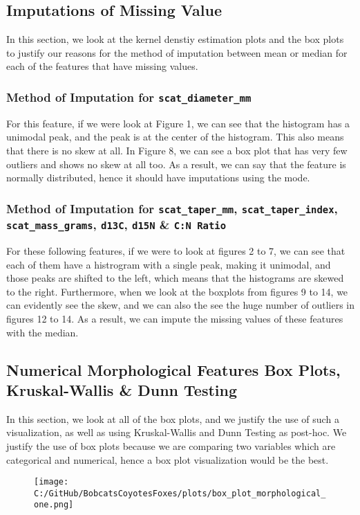 \documentclass[a4paper]{article}
\begin{document}
\subsection{Imputations of Missing Value}
In this section, we look at the kernel denstiy estimation plots and the box plots to justify our reasons for the method of imputation between mean or median 
for each of the features that have missing values.

\subsubsection{Method of Imputation for \texttt{scat\_diameter\_mm}}
For this feature, if we were look at Figure 1, we can see that the histogram has a unimodal peak, and the peak is at the center of the histogram. This also
means that there is no skew at all. In Figure 8, we can see a box plot that has very few outliers and shows no skew at all too. As a result, we can say that
the feature is normally distributed, hence it should have imputations using the mode.

\subsubsection{Method of Imputation for \texttt{scat\_taper\_mm}, \texttt{scat\_taper\_index}, \texttt{scat\_mass\_grams}, \texttt{d13C}, \texttt{d15N} \& 
\texttt{C:N Ratio}}
For these following features, if we were to look at figures 2 to 7, we can see that each of them have a histrogram with a single peak, making it unimodal,
and those peaks are shifted to the left, which means that the histograms are skewed to the right.  Furthermore, when we look at the boxplots from figures
9 to 14, we can evidently see the skew, and we can also the see the huge number of outliers in figures 12 to 14. As a result, we can impute the missing values
of these features with the median.

\newpage

\subsection{Numerical Morphological Features Box Plots, Kruskal-Wallis \& Dunn Testing}
In this section, we look at all of the box plots, and we justify the use of such a visualization, as well as using Kruskal-Wallis and Dunn Testing as post-hoc.
We justify the use of box plots because we are comparing two variables which are categorical and numerical, hence a box plot  visualization would be the best.
\vspace{0.5cm}
\begin{figure}[h]
    \centering
    \texttt{[image: C:/GitHub/BobcatsCoyotesFoxes/plots/box\_plot\_morphological\_one.png]} 
\end{figure}
\end{document}
